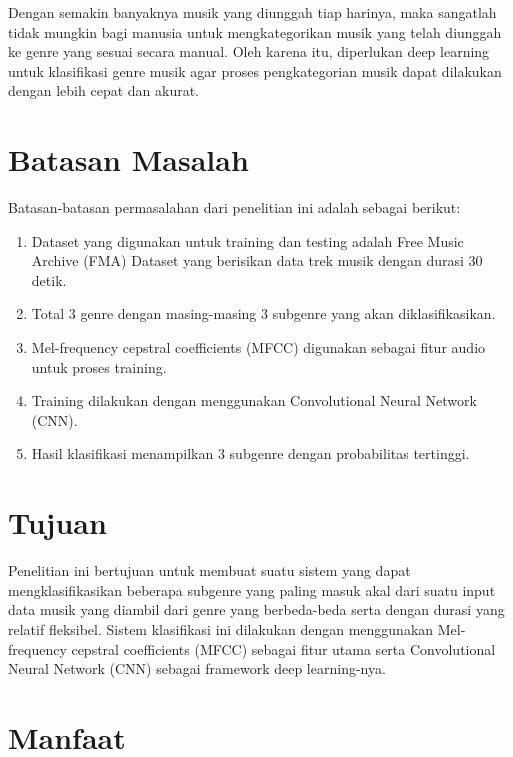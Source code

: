 Dengan semakin banyaknya musik yang diunggah tiap harinya, maka sangatlah tidak mungkin bagi manusia untuk mengkategorikan musik yang telah diunggah ke genre yang sesuai secara manual. Oleh karena itu, diperlukan deep learning untuk klasifikasi genre musik agar proses pengkategorian musik dapat dilakukan dengan lebih cepat dan akurat.

\section{Batasan Masalah}
\label{sec:batasanmasalah}

Batasan-batasan permasalahan dari penelitian ini adalah sebagai berikut:

\begin{enumerate}[nolistsep]

  \item Dataset yang digunakan untuk training dan testing adalah Free Music Archive (FMA) Dataset yang berisikan data trek musik dengan durasi 30 detik.

  \item Total 3 genre dengan masing-masing 3 subgenre yang akan diklasifikasikan.

  \item Mel-frequency cepstral coefficients (MFCC) digunakan sebagai fitur audio untuk proses training.
  
  \item Training dilakukan dengan menggunakan Convolutional Neural Network (CNN).
  
  \item Hasil klasifikasi menampilkan 3 subgenre dengan probabilitas tertinggi.
 
\end{enumerate}

\section{Tujuan}
\label{sec:Tujuan}

Penelitian ini bertujuan untuk membuat suatu sistem yang dapat mengklasifikasikan beberapa subgenre yang paling masuk akal dari suatu input data musik yang diambil dari genre yang berbeda-beda serta dengan durasi yang relatif fleksibel. Sistem klasifikasi ini dilakukan dengan menggunakan Mel-frequency cepstral coefficients (MFCC) sebagai fitur utama serta Convolutional Neural Network (CNN) sebagai framework deep learning-nya.

\section{Manfaat}
\label{sec:manfaat}

